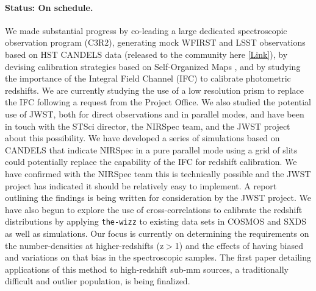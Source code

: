 \paragraph*{Status: On schedule.} We made substantial progress by co-leading a
large dedicated spectroscopic observation program (C3R2), generating mock WFIRST
and LSST observations based on HST CANDELS data (released to the community here
\href{http://www.wfirst-hls-cosmology.org/products/}{[Link]}), by devising
calibration strategies based on Self-Organized Maps
\citep{Masters2017,Hemmati:2018}, and by studying the importance of the Integral
Field Channel (IFC) to calibrate photometric redshifts. We are currently
studying the use of a low resolution prism to replace the IFC following a
request from the Project Office. We also studied the potential use of JWST, both
for direct observations and in parallel modes, and have been in touch with the
STSci director, the NIRSpec team, and the JWST project about this possibility.
We have developed a series of simulations based on CANDELS that indicate NIRSpec
in a pure parallel mode using a grid of slits could potentially replace the
capability of the IFC for redshift calibration.  We have confirmed with the
NIRSpec team this is technically possible and the JWST project has indicated it
should be relatively easy to implement. A report outlining the findings is being
written for consideration by the JWST project. We have also begun to explore the
use of cross-correlations to calibrate the redshift distributions by applying
\texttt{the-wizz} \citep{Morrison:2017} to existing data sets in COSMOS and SXDS
as well as simulations.  Our focus is currently on determining the requirements
on the number-densities at higher-redshifts (z$>$1) and the effects of having
biased and variations on that bias in the spectroscopic samples.  The first
paper detailing applications of this method to high-redshift sub-mm sources, a
traditionally difficult and outlier population, is being finalized.

